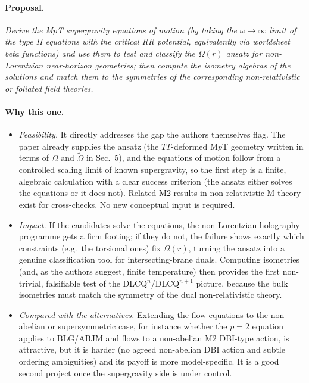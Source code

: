 \documentclass[11pt]{article}
\newcommand{\TT}{T\bar T}
\begin{document}
\paragraph{Proposal.}
\emph{Derive the M$p$T supergravity equations of motion (by taking the $\omega\to\infty$ limit of the type II equations with the critical RR potential, equivalently via worldsheet beta functions) and use them to test and classify the $\mathbb{\Omega}(r)$ ansatz for non-Lorentzian near-horizon geometries; then compute the isometry algebras of the solutions and match them to the symmetries of the corresponding non-relativistic or foliated field theories.}

\paragraph{Why this one.}
\begin{itemize}[nosep]
\item \emph{Feasibility.} It directly addresses the gap the authors themselves flag. The paper already supplies the ansatz (the $\TT$-deformed M$p$T geometry written in terms of $\mathbb{\Omega}$ and $\tilde{\mathbb{\Omega}}$ in Sec.~5), and the equations of motion follow from a controlled scaling limit of known supergravity, so the first step is a finite, algebraic calculation with a clear success criterion (the ansatz either solves the equations or it does not). Related M2 results in non-relativistic M-theory exist for cross-checks. No new conceptual input is required.
\item \emph{Impact.} If the candidates solve the equations, the non-Lorentzian holography programme gets a firm footing; if they do not, the failure shows exactly which constraints (e.g.\ the torsional ones) fix $\mathbb{\Omega}(r)$, turning the ansatz into a genuine classification tool for intersecting-brane duals. Computing isometries (and, as the authors suggest, finite temperature) then provides the first non-trivial, falsifiable test of the DLCQ$^n$/DLCQ$^{n+1}$ picture, because the bulk isometries must match the symmetry of the dual non-relativistic theory.
\item \emph{Compared with the alternatives.} Extending the flow equations to the non-abelian or supersymmetric case, for instance whether the $p=2$ equation applies to BLG/ABJM and flows to a non-abelian M2 DBI-type action, is attractive, but it is harder (no agreed non-abelian DBI action and subtle ordering ambiguities) and its payoff is more model-specific. It is a good second project once the supergravity side is under control.
\end{itemize}
\end{document}

